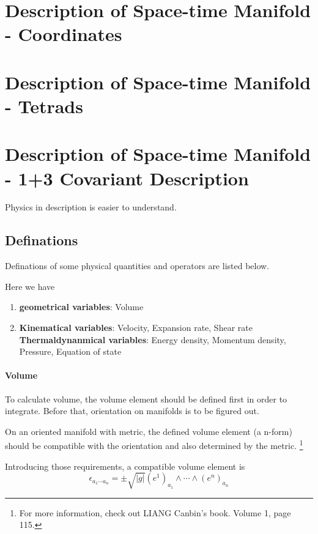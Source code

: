 \section{Description of Space-time Manifold - Coordinates}

\section{Description of Space-time Manifold - Tetrads}




\section{Description of Space-time Manifold - 1+3 Covariant Description}

Physics in description is easier to understand.

\subsection{Definations}

Definations of some physical quantities and operators are listed below.

Here we have
\begin{enumerate}
	\item 
{\bf geometrical variables}: Volume
\item
{\bf Kinematical variables}: Velocity, Expansion rate, Shear rate
{\bf Thermaldynanmical variables}: Energy density, Momentum density, Pressure, Equation of state
\end{enumerate}




\paragraph{Volume}

To calculate volume, the volume element should be defined first in order to integrate. Before that, orientation on manifolds is to be figured out.

On an oriented manifold with metric, the defined volume element (a n-form) should be compatible with the orientation and also determined by the metric. \footnote{For more information, check out LIANG Canbin's book. Volume 1, page 115.}

Introducing those requirements, a compatible volume element is
\begin{equation}
\epsilon_{a_1\cdots a_n} = \pm \sqrt{|g|} (e^1)_{a_1}\wedge \cdots \wedge (e^n)_{a_n}
\end{equation}

